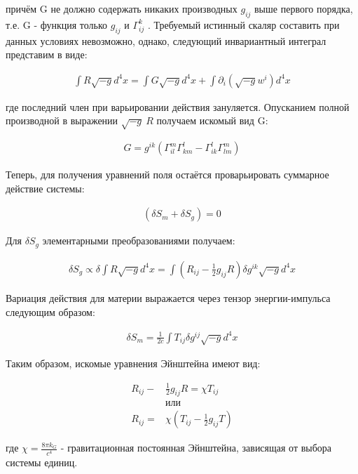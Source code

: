 \documentclass[a4paper,14pt]{article}
\begin{document}
	причём G не должно содержать никаких производных $ g_{ij} $ выше первого порядка, т.е. G - функция только $ g_{ij} $ и $ \Gamma_{ij}^k $ . Требуемый истинный скаляр составить при данных условиях невозможно, однако, следующий инвариантный интеграл представим в виде:

	\begin{align*}
		\int R \sqrt{-g} d^4 x = \int G \sqrt{-g} d^4 x + \int \partial_i ( \sqrt{-g} w^i ) d^4 x
	\end{align*}

	где последний член при варьировании действия зануляется. Опусканием полной производной в выражении $ \sqrt{-g} \: R $ получаем искомый вид G:

	\begin{align*}
		G = g^{ik} ( \Gamma_{il}^m \Gamma_{km}^l - \Gamma_{ik}^l \Gamma_{lm}^m )
	\end{align*}

	Теперь, для получения уравнений поля остаётся проварьировать суммарное действие системы:

	\begin{align*}
		( \delta S_m + \delta S_g ) = 0
	\end{align*}

	Для $ \delta S_g $ элементарными преобразованиями получаем:

	\begin{align*}
		\delta S_g \propto \delta \int R \sqrt{-g} d^4 x =  \int ( R_{ij} - \frac{1}{2} g_{ij} R) \delta g^{ik} \sqrt{-g} d^4 x
	\end{align*}


	Вариация действия для материи выражается через тензор энергии-импульса следующим образом: 

	\begin{align*}
		\delta S_m = \frac{1}{2c} \int T_{ij} \delta g^{ij} \sqrt{-g} d^4 x
	\end{align*}

	Таким образом, искомые уравнения Эйнштейна имеют вид:

	\begin{align*}
		R_{ij} - & \frac{1}{2} g_{ij} R = \chi T_{ij} \\
		& или               \\
		R_{ij} = & \chi ( T_{ij} - \frac{1}{2} g_{ij} T )
	\end{align*}

	где $\chi = \frac{8 \pi k_G }{ c^4 }$ - гравитационная постоянная Эйнштейна, зависящая от выбора системы единиц. \\
\end{document}
